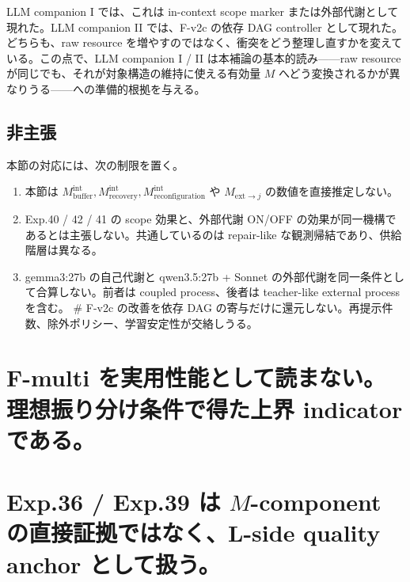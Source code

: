 \documentclass[12pt,a4paper]{article}
\begin{document}
LLM companion I では、これは in-context scope marker または外部代謝として現れた。LLM companion II では、F-v2c の依存 DAG controller として現れた。どちらも、raw resource を増やすのではなく、衝突をどう整理し直すかを変えている。この点で、LLM companion I / II は本補論の基本的読み------raw resource が同じでも、それが対象構造の維持に使える有効量 \(M\) へどう変換されるかが異なりうる------への準備的根拠を与える。

\subsection{非主張}\label{ux975eux4e3bux5f35}

本節の対応には、次の制限を置く。

\begin{enumerate}
\def\labelenumi{\arabic{enumi}.}
\tightlist
\item
  本節は \(M_{\mathrm{buffer}}^{\mathrm{int}}, M_{\mathrm{recovery}}^{\mathrm{int}}, M_{\mathrm{reconfiguration}}^{\mathrm{int}}\) や \(M_{\mathrm{ext}\to j}\) の数値を直接推定しない。
\item
  Exp.40 / 42 / 41 の scope 効果と、外部代謝 ON/OFF の効果が同一機構であるとは主張しない。共通しているのは repair-like な観測帰結であり、供給階層は異なる。
\item
  gemma3:27b の自己代謝と qwen3.5:27b + Sonnet の外部代謝を同一条件として合算しない。前者は coupled process、後者は teacher-like external process を含む。 \# F-v2c の改善を依存 DAG の寄与だけに還元しない。再提示件数、除外ポリシー、学習安定性が交絡しうる。
\end{enumerate}

\section{F-multi を実用性能として読まない。理想振り分け条件で得た上界 indicator である。}\label{f-multi-ux3092ux5b9fux7528ux6027ux80fdux3068ux3057ux3066ux8aadux307eux306aux3044ux7406ux60f3ux632fux308aux5206ux3051ux6761ux4ef6ux3067ux5f97ux305fux4e0aux754c-indicator-ux3067ux3042ux308b}

\section{\texorpdfstring{Exp.36 / Exp.39 は \(M\)-component の直接証拠ではなく、L-side quality anchor として扱う。}{Exp.36 / Exp.39 は M-component の直接証拠ではなく、L-side quality anchor として扱う。}}\label{exp.36-exp.39-ux306f-m-component-ux306eux76f4ux63a5ux8a3cux62e0ux3067ux306fux306aux304fl-side-quality-anchor-ux3068ux3057ux3066ux6271ux3046}
\end{document}
